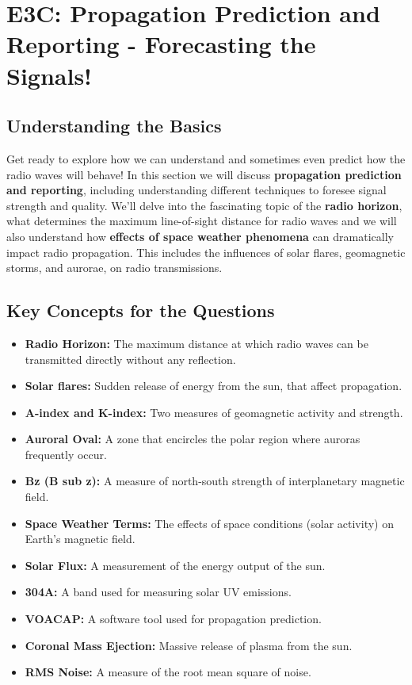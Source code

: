 \section{E3C: Propagation Prediction and Reporting - Forecasting the Signals!}

\subsection*{Understanding the Basics}
Get ready to explore how we can understand and sometimes even predict how the radio waves will behave! In this section we will discuss \textcolor{myblue}{\textbf{propagation prediction and reporting}}, including understanding different techniques to foresee signal strength and quality. We'll delve into the fascinating topic of the \textcolor{myblue}{\textbf{radio horizon}}, what determines the maximum line-of-sight distance for radio waves and we will also understand how \textcolor{myblue}{\textbf{effects of space weather phenomena}} can dramatically impact radio propagation. This includes the influences of solar flares, geomagnetic storms, and aurorae, on radio transmissions.

\subsection*{Key Concepts for the Questions}
\begin{itemize}
    \item \textbf{Radio Horizon:}  The maximum distance at which radio waves can be transmitted directly without any reflection.
        \item \textbf{Solar flares:}  Sudden release of energy from the sun, that affect propagation.
    \item \textbf{A-index and K-index:} Two measures of geomagnetic activity and strength.
     \item \textbf{Auroral Oval:} A zone that encircles the polar region where auroras frequently occur.
    \item \textbf{Bz (B sub z):} A measure of north-south strength of interplanetary magnetic field.
       \item \textbf{Space Weather Terms:} The effects of space conditions (solar activity) on Earth's magnetic field.
     \item \textbf{Solar Flux:} A measurement of the energy output of the sun.
       \item \textbf{304A:}  A band used for measuring solar UV emissions.
           \item  \textbf{VOACAP:} A software tool used for propagation prediction.
            \item  \textbf{Coronal Mass Ejection:} Massive release of plasma from the sun.
            \item \textbf{RMS Noise:} A measure of the root mean square of noise.

\end{itemize}

